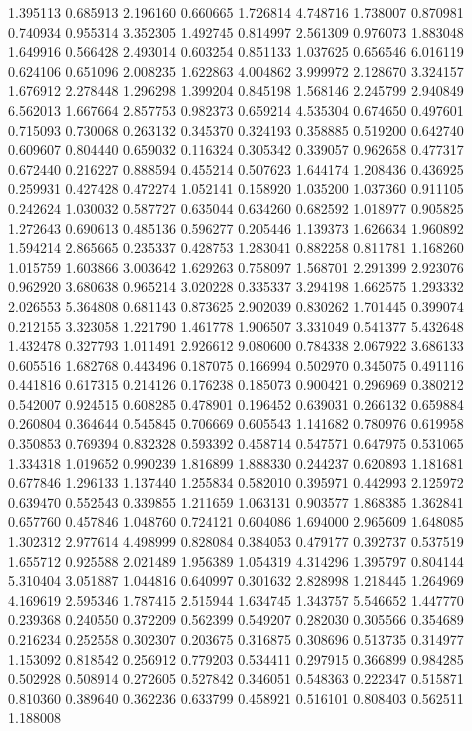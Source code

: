 1.395113
0.685913
2.196160
0.660665
1.726814
4.748716
1.738007
0.870981
0.740934
0.955314
3.352305
1.492745
0.814997
2.561309
0.976073
1.883048
1.649916
0.566428
2.493014
0.603254
0.851133
1.037625
0.656546
6.016119
0.624106
0.651096
2.008235
1.622863
4.004862
3.999972
2.128670
3.324157
1.676912
2.278448
1.296298
1.399204
0.845198
1.568146
2.245799
2.940849
6.562013
1.667664
2.857753
0.982373
0.659214
4.535304
0.674650
0.497601
0.715093
0.730068
0.263132
0.345370
0.324193
0.358885
0.519200
0.642740
0.609607
0.804440
0.659032
0.116324
0.305342
0.339057
0.962658
0.477317
0.672440
0.216227
0.888594
0.455214
0.507623
1.644174
1.208436
0.436925
0.259931
0.427428
0.472274
1.052141
0.158920
1.035200
1.037360
0.911105
0.242624
1.030032
0.587727
0.635044
0.634260
0.682592
1.018977
0.905825
1.272643
0.690613
0.485136
0.596277
0.205446
1.139373
1.626634
1.960892
1.594214
2.865665
0.235337
0.428753
1.283041
0.882258
0.811781
1.168260
1.015759
1.603866
3.003642
1.629263
0.758097
1.568701
2.291399
2.923076
0.962920
3.680638
0.965214
3.020228
0.335337
3.294198
1.662575
1.293332
2.026553
5.364808
0.681143
0.873625
2.902039
0.830262
1.701445
0.399074
0.212155
3.323058
1.221790
1.461778
1.906507
3.331049
0.541377
5.432648
1.432478
0.327793
1.011491
2.926612
9.080600
0.784338
2.067922
3.686133
0.605516
1.682768
0.443496
0.187075
0.166994
0.502970
0.345075
0.491116
0.441816
0.617315
0.214126
0.176238
0.185073
0.900421
0.296969
0.380212
0.542007
0.924515
0.608285
0.478901
0.196452
0.639031
0.266132
0.659884
0.260804
0.364644
0.545845
0.706669
0.605543
1.141682
0.780976
0.619958
0.350853
0.769394
0.832328
0.593392
0.458714
0.547571
0.647975
0.531065
1.334318
1.019652
0.990239
1.816899
1.888330
0.244237
0.620893
1.181681
0.677846
1.296133
1.137440
1.255834
0.582010
0.395971
0.442993
2.125972
0.639470
0.552543
0.339855
1.211659
1.063131
0.903577
1.868385
1.362841
0.657760
0.457846
1.048760
0.724121
0.604086
1.694000
2.965609
1.648085
1.302312
2.977614
4.498999
0.828084
0.384053
0.479177
0.392737
0.537519
1.655712
0.925588
2.021489
1.956389
1.054319
4.314296
1.395797
0.804144
5.310404
3.051887
1.044816
0.640997
0.301632
2.828998
1.218445
1.264969
4.169619
2.595346
1.787415
2.515944
1.634745
1.343757
5.546652
1.447770
0.239368
0.240550
0.372209
0.562399
0.549207
0.282030
0.305566
0.354689
0.216234
0.252558
0.302307
0.203675
0.316875
0.308696
0.513735
0.314977
1.153092
0.818542
0.256912
0.779203
0.534411
0.297915
0.366899
0.984285
0.502928
0.508914
0.272605
0.527842
0.346051
0.548363
0.222347
0.515871
0.810360
0.389640
0.362236
0.633799
0.458921
0.516101
0.808403
0.562511
1.188008
